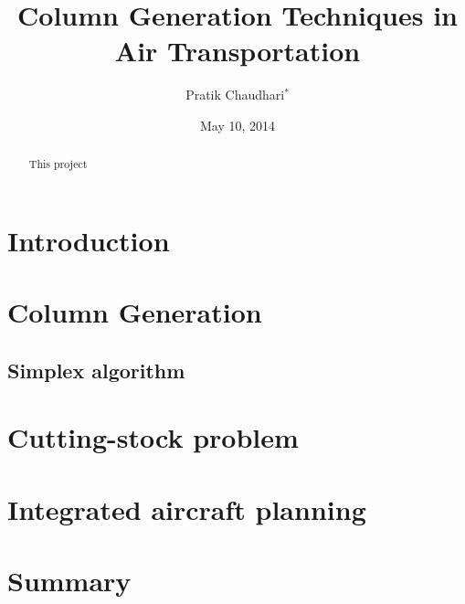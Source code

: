 \documentclass[letterpaper, 10pt, reqno]{amsart}
\title{Column Generation Techniques in Air Transportation}
\author{Pratik Chaudhari$^*$}
\date{May 10, 2014}
\begin{document}
\begin{abstract}
This project
\end{abstract}
\maketitle

\section{Introduction}
\label{sec:intro}

\section{Column Generation}
\label{sec:column_generation}

\subsection{Simplex algorithm}
\label{ssec:simplex}



\section{Cutting-stock problem}
\label{sec:cutting_stock}

\section{Integrated aircraft planning}



\section{Summary}
\label{sec:summary}


{
\small


}
\end{document}
